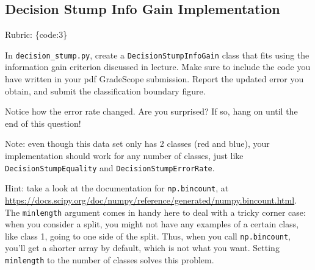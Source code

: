 \documentclass{article}
\def\rubric#1{\gre{Rubric: \{#1\}}}{}
\def\blu#1{{\color{blu}#1}}
\def\gre#1{{\color{gre}#1}}
\begin{document}
\subsection{Decision Stump Info Gain Implementation}
\rubric{code:3}

In \texttt{decision\string_stump.py}, \blu{create a \texttt{DecisionStumpInfoGain} class that 
fits using the information gain criterion discussed in lecture. Make sure to include the code you have written in your pdf GradeScope submission. Report the updated error you obtain, and submit the classification boundary figure.}

Notice how the error rate changed. Are you surprised? If so, hang on until the end of this question!

Note: even though this data set only has 2 classes (red and blue), your implementation should work 
for any number of classes, just like \texttt{DecisionStumpEquality} and \texttt{DecisionStumpErrorRate}.

Hint: take a look at the documentation for \texttt{np.bincount}, at \\
\url{https://docs.scipy.org/doc/numpy/reference/generated/numpy.bincount.html}. 
The \texttt{minlength} argument comes in handy here to deal with a tricky corner case:
when you consider a split, you might not have any examples of a certain class, like class 1,
going to one side of the split. Thus, when you call \texttt{np.bincount}, you'll get
a shorter array by default, which is not what you want. Setting \texttt{minlength} to the 
number of classes solves this problem.
\end{document}
